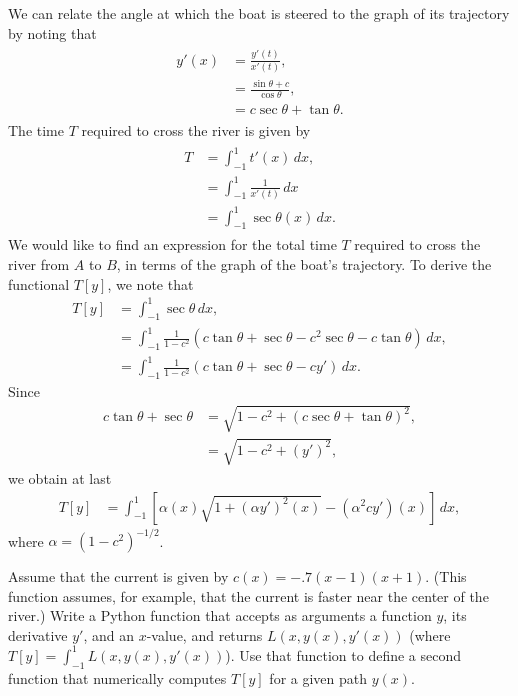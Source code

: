 We can relate the angle at which the boat is steered to the graph of its trajectory by noting that 
\begin{align}
\begin{split}
	y'(x) &= \frac{y'(t)}{x'(t)} ,\\
	&= \frac{\sin \theta + c}{\cos \theta},\\
	&= c\sec \theta + \tan \theta .%
\end{split} \label{rivercrossing:angle}
\end{align}
The time $T$ required to cross the river is given by
\begin{align}
\begin{split}
	T &= \int_{-1}^1 t'(x)\, dx, \\
	&= \int_{-1}^1 \frac{1}{x'(t)}\, dx \\ 
	&= \int_{-1}^1 \sec \theta (x)\, dx. 
\end{split}\label{rivercrossing:T}
\end{align}
We would like to find an expression for the total time $T$ required to cross the river from $A$ to $B$, in terms of the graph of the boat's trajectory. 
To derive the functional $T[y]$, we note that 
\begin{align*}
	T[y] &= \int_{-1}^1 \sec \theta\, dx,\\
	&= \int_{-1}^1 \frac{1}{1-c^2}(c \tan \theta + \sec \theta -c^2 \sec \theta - c\tan \theta)\, dx, \\
	&= \int_{-1}^1 \frac{1}{1-c^2}(c \tan \theta + \sec \theta -c y' )\, dx.	
\end{align*}
Since 
\begin{align*}
	c\tan \theta + \sec \theta &= \sqrt{1 - c^2 + (c \sec \theta + \tan \theta)^2},\\
	&= \sqrt{1 - c^2 + (y')^2},
\end{align*}
we obtain at last
\begin{align}
	T[y] &= \int_{-1}^1 \left[ \alpha(x)\sqrt{1 + (\alpha y')^2(x)} - (\alpha^2 c y')(x) \right]\, dx,
\end{align}
where $\alpha = (1 - c^2)^{-1/2}$.

\begin{problem}
Assume that the current is given by $c(x) = -.7(x-1)(x+1)$. (This function assumes, for example, that the current is faster near the center of the river.)
Write a Python function that accepts as arguments a function $y$, its derivative $y'$, and an $x$-value, and returns $L(x,y(x),y'(x))$ (where $T[y] = \int_{-1}^1 L(x,y(x),y'(x))$). Use that function to define a second function that numerically computes $T[y]$ for a given path $y(x)$. 
\end{problem}

